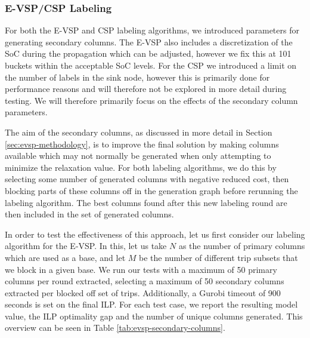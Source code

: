 \documentclass[]{article}
\begin{document}
\subsubsection{E-VSP/CSP Labeling} \label{sec:params-sec-label-columns}
For both the E-VSP and CSP labeling algorithms, we introduced parameters for generating secondary columns. The E-VSP also includes a discretization of the SoC during the propagation which can be adjusted, however we fix this at 101 buckets within the acceptable SoC levels. For the CSP we introduced a limit on the number of labels in the sink node, however this is primarily done for performance reasons and will therefore not be explored in more detail during testing. We will therefore primarily focus on the effects of the secondary column parameters. 

The aim of the secondary columns, as discussed in more detail in Section \ref{sec:evsp-methodology}, is to improve the final solution by making columns available which may not normally be generated when only attempting to minimize the relaxation value. For both labeling algorithms, we do this by selecting some number of generated columns with negative reduced cost, then blocking parts of these columns off in the generation graph before rerunning the labeling algorithm. The best columns found after this new labeling round are then included in the set of generated columns.

In order to test the effectiveness of this approach, let us first consider our labeling algorithm for the E-VSP. In this, let us take $N$ as the number of primary columns which are used as a base, and let $M$ be the number of different trip subsets that we block in a given base. We run our tests with a maximum of 50 primary columns per round extracted, selecting a maximum of 50 secondary columns extracted per blocked off set of trips. Additionally, a Gurobi timeout of 900 seconds is set on the final ILP. For each test case, we report the resulting model value, the ILP optimality gap and the number of unique columns generated. This overview can be seen in Table \ref{tab:evsp-secondary-columns}. 
\end{document}
